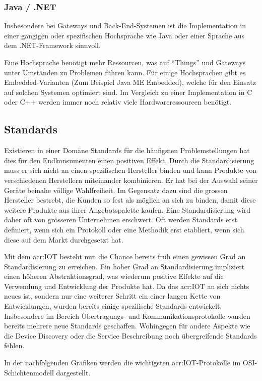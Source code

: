 \subsubsection{Java / .NET}
Insbesondere bei Gateways und Back-End-Systemen ist die Implementation in einer gängigen oder spezifischen Hochsprache wie Java oder einer Sprache aus dem .NET-Framework sinnvoll.


Eine Hochsprache benötigt mehr Ressourcen, was auf "`Things"' und Gateways unter Umständen zu Problemen führen kann. Für einige Hochsprachen gibt es Embedded-Varianten (Zum Beispiel Java ME Embedded), welche für den Einsatz auf solchen Systemen optimiert sind. Im Vergleich zu einer Implementation in C oder C++ werden immer noch relativ viele Hardwareressourcen benötigt.


\subsection{Standards}
Existieren in einer Domäne Standards für die häufigsten Problemstellungen hat dies für den Endkonsumenten einen positiven Effekt. Durch die Standardisierung muss er sich nicht an einen spezifischen Hersteller binden und kann Produkte von verschiedenen Herstellern miteinander kombinieren. Er hat bei der Auswahl seiner Geräte beinahe völlige Wahlfreiheit. Im Gegensatz dazu sind die grossen Hersteller bestrebt, die Kunden so fest als möglich an sich zu binden, damit diese weitere Produkte aus ihrer Angebotspalette kaufen. Eine Standardisierung wird daher oft von grösseren Unternehmen erschwert. Oft werden Standards erst definiert, wenn sich ein Protokoll oder eine Methodik erst etabliert, wenn sich diese auf dem Markt durchgesetzt hat. 

Mit dem \gls{acr:IOT} besteht nun die Chance bereits früh einen gewissen Grad an Standardisierung zu erreichen. Ein hoher Grad an Standardisierung impliziert einen höheren Abstraktionsgrad, was wiederum positive Effekte auf die Verwendung und Entwicklung der Produkte hat. Da das \gls{acr:IOT} an sich nichts neues ist, sondern nur eine weiterer Schritt ein einer langen Kette von Entwicklungen, wurden bereits einige spezifische Standards entwickelt. Insbesondere im Bereich Übertragungs- und Kommunikationsprotokolle wurden bereits mehrere neue Standards geschaffen. Wohingegen für andere Aspekte wie die Device Discovery oder die Service Beschreibung noch übergreifende Standards fehlen.
 
In der nachfolgenden Grafiken werden die wichtigsten \gls{acr:IOT}-Protokolle im OSI-Schichtenmodell dargestellt.

